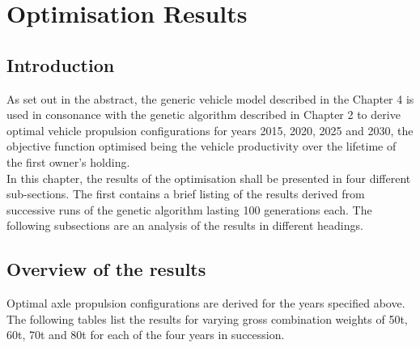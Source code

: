 \documentclass[ExampleMasters.tex]{subfiles}
\begin{document}
\chapter{Optimisation Results}

\section{Introduction}
As set out in the abstract, the generic vehicle model described in the Chapter 4 is used in consonance with the genetic algorithm described in Chapter 2 to derive optimal vehicle propulsion configurations for years 2015, 2020, 2025 and 2030, the objective function optimised being the vehicle productivity over the lifetime of the first owner's holding.\\

In this chapter, the results of the optimisation shall be presented in four different sub-sections. The first contains a brief listing of the results derived from successive runs of the genetic algorithm lasting 100 generations each. The following subsections are an analysis of the results in different headings.

\section{Overview of the results}
Optimal axle propulsion configurations are derived for the years specified above. The following tables list the results for varying gross combination weights of 50t, 60t, 70t and 80t for each of the four years in succession.
\end{document}
